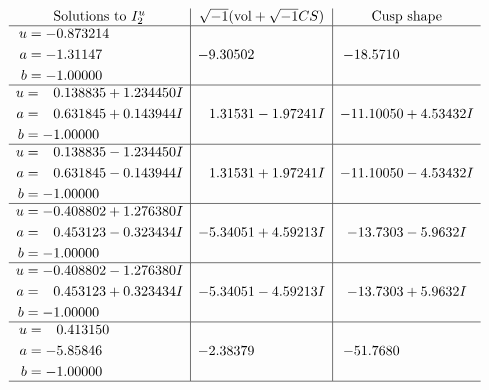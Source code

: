 \documentclass[1p]{elsarticle_modified}
\theoremstyle{definition}
\newcommand{\I}{\sqrt{-1}}
\begin{document}
$$\begin{array}{c|c|c}  
\text{Solutions to }I^u_{2}& \I (\text{vol} + \sqrt{-1}CS) & \text{Cusp shape}\\
 \hline 
\begin{aligned}
u &= -0.873214\phantom{ +0.000000I} \\
a &= -1.31147\phantom{ +0.000000I} \\
b &= -1.00000\phantom{ +0.000000I}\end{aligned}
 & -9.30502\phantom{ +0.000000I} & -18.5710\phantom{ +0.000000I} \\ \hline\begin{aligned}
u &= \phantom{-}0.138835 + 1.234450 I \\
a &= \phantom{-}0.631845 + 0.143944 I \\
b &= -1.00000\phantom{ +0.000000I}\end{aligned}
 & \phantom{-}1.31531 - 1.97241 I & -11.10050 + 4.53432 I \\ \hline\begin{aligned}
u &= \phantom{-}0.138835 - 1.234450 I \\
a &= \phantom{-}0.631845 - 0.143944 I \\
b &= -1.00000\phantom{ +0.000000I}\end{aligned}
 & \phantom{-}1.31531 + 1.97241 I & -11.10050 - 4.53432 I \\ \hline\begin{aligned}
u &= -0.408802 + 1.276380 I \\
a &= \phantom{-}0.453123 - 0.323434 I \\
b &= -1.00000\phantom{ +0.000000I}\end{aligned}
 & -5.34051 + 4.59213 I & -13.7303 - 5.9632 I \\ \hline\begin{aligned}
u &= -0.408802 - 1.276380 I \\
a &= \phantom{-}0.453123 + 0.323434 I \\
b &= -1.00000\phantom{ +0.000000I}\end{aligned}
 & -5.34051 - 4.59213 I & -13.7303 + 5.9632 I \\ \hline\begin{aligned}
u &= \phantom{-}0.413150\phantom{ +0.000000I} \\
a &= -5.85846\phantom{ +0.000000I} \\
b &= -1.00000\phantom{ +0.000000I}\end{aligned}
 & -2.38379\phantom{ +0.000000I} & -51.7680\phantom{ +0.000000I}\\
 \hline 
 \end{array}$$\newpage
\end{document}
